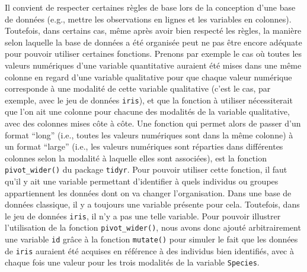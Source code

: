\documentclass[
  french,
]{book}
\newenvironment{Shaded}{\begin{snugshade}}{\end{snugshade}}
\newcommand{\DataTypeTok}[1]{\textcolor[rgb]{0.13,0.29,0.53}{#1}}
\newcommand{\DecValTok}[1]{\textcolor[rgb]{0.00,0.00,0.81}{#1}}
\newcommand{\KeywordTok}[1]{\textcolor[rgb]{0.13,0.29,0.53}{\textbf{#1}}}
\newcommand{\NormalTok}[1]{#1}
\newcommand{\OperatorTok}[1]{\textcolor[rgb]{0.81,0.36,0.00}{\textbf{#1}}}
\newcommand{\StringTok}[1]{\textcolor[rgb]{0.31,0.60,0.02}{#1}}
\begin{document}
Il convient de respecter certaines règles de base lors de la conception d'une base de données (e.g., mettre les observations en lignes et les variables en colonnes). Toutefois, dans certains cas, même après avoir bien respecté les règles, la manière selon laquelle la base de données a été organisée peut ne pas être encore adéquate pour pouvoir utiliser certaines fonctions. Prenons par exemple le cas où toutes les valeurs numériques d'une variable quantitative auraient été mises dans une même colonne en regard d'une variable qualitative pour que chaque valeur numérique corresponde à une modalité de cette variable qualitative (c'est le cas, par exemple, avec le jeu de données \texttt{iris}), et que la fonction à utiliser nécessiterait que l'on ait une colonne pour chacune des modalités de la variable qualitative, avec des colonnes mises côte à côte. Une fonction qui permet alors de passer d'un format \enquote{long} (i.e., toutes les valeurs numériques sont dans la même colonne) à un format \enquote{large} (i.e., les valeurs numériques sont réparties dans différentes colonnes selon la modalité à laquelle elles sont associées), est la fonction \texttt{pivot\_wider()} du package \texttt{tidyr}. Pour pouvoir utiliser cette fonction, il faut qu'il y ait une variable permettant d'identifier à quels individus ou groupes appartiennent les données dont on va changer l'organisation. Dans une base de données classique, il y a toujours une variable présente pour cela. Toutefois, dans le jeu de données \texttt{iris}, il n'y a pas une telle variable. Pour pouvoir illustrer l'utilisation de la fonction \texttt{pivot\_wider()}, nous avons donc ajouté arbitrairement une variable \texttt{id} grâce à la fonction \texttt{mutate()} pour simuler le fait que les données de \texttt{iris} auraient été acquises en référence à des individus bien identifiés, avec à chaque fois une valeur pour les trois modalités de la variable \texttt{Species}.

\begin{Shaded}
\end{Shaded}
\end{document}
